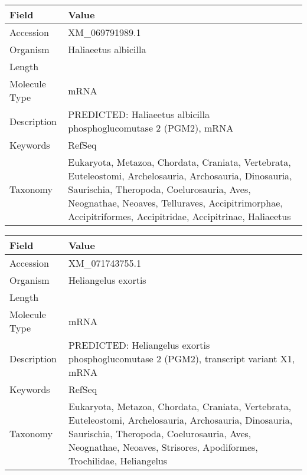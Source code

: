 \documentclass[10pt]{article}
\begin{document}
\vspace{1em}
{\footnotesize
\begin{longtable}{>{\raggedright\arraybackslash}p{4.5cm} >{\raggedright\arraybackslash}p{11.5cm}}
\textbf{Field} & \textbf{Value} \\
\hline
Accession & XM\_069791989.1 \\
Organism & Haliaeetus albicilla \\
Length & 2203 \\
Molecule Type & mRNA \\
Description & PREDICTED: Haliaeetus albicilla phosphoglucomutase 2 (PGM2), mRNA \\
Keywords & RefSeq \\
Taxonomy & Eukaryota, Metazoa, Chordata, Craniata, Vertebrata, Euteleostomi, Archelosauria, Archosauria, Dinosauria, Saurischia, Theropoda, Coelurosauria, Aves, Neognathae, Neoaves, Telluraves, Accipitrimorphae, Accipitriformes, Accipitridae, Accipitrinae, Haliaeetus \\
\end{longtable}
}

\vspace{1em}
{\footnotesize
\begin{longtable}{>{\raggedright\arraybackslash}p{4.5cm} >{\raggedright\arraybackslash}p{11.5cm}}
\textbf{Field} & \textbf{Value} \\
\hline
Accession & XM\_071743755.1 \\
Organism & Heliangelus exortis \\
Length & 6511 \\
Molecule Type & mRNA \\
Description & PREDICTED: Heliangelus exortis phosphoglucomutase 2 (PGM2), transcript variant X1, mRNA \\
Keywords & RefSeq \\
Taxonomy & Eukaryota, Metazoa, Chordata, Craniata, Vertebrata, Euteleostomi, Archelosauria, Archosauria, Dinosauria, Saurischia, Theropoda, Coelurosauria, Aves, Neognathae, Neoaves, Strisores, Apodiformes, Trochilidae, Heliangelus \\
\end{longtable}
}
\end{document}
